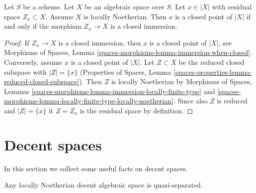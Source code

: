 \begin{lemma}
\label{lemma-residual-space-closed}
Let $S$ be a scheme. Let $X$ be an algebraic space over $S$. Let $x \in |X|$
with residual space $Z_x \subset X$. Assume $X$ is locally Noetherian.
Then $x$ is a closed point of $|X|$ if and only if
the morphism $Z_x \to X$ is a closed immersion.
\end{lemma}

\begin{proof}
If $Z_x \to X$ is a closed immersion, then $x$ is a closed point of $|X|$, see
Morphisms of Spaces, Lemma \ref{spaces-morphisms-lemma-immersion-when-closed}.
Conversely, assume $x$ is a closed point of $|X|$.
Let $Z \subset X$ be the reduced closed subspace with $|Z| = \{x\}$
(Properties of Spaces,
Lemma \ref{spaces-properties-lemma-reduced-closed-subspace}).
Then $Z$ is locally Noetherian by Morphisms of Spaces, Lemmas
\ref{spaces-morphisms-lemma-immersion-locally-finite-type} and
\ref{spaces-morphisms-lemma-locally-finite-type-locally-noetherian}.
Since also $Z$ is reduced and $|Z| = \{x\}$ it $Z = Z_x$ is the
residual space by definition.
\end{proof}











\section{Decent spaces}
\label{section-decent}

\noindent
In this section we collect some useful facts on decent spaces.

\begin{lemma}
\label{lemma-locally-Noetherian-decent-quasi-separated}
Any locally Noetherian decent algebraic space is quasi-separated.
\end{lemma}

